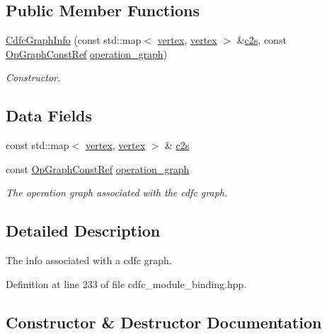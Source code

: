 \subsection*{Public Member Functions}
\begin{DoxyCompactItemize}
\item 
\hyperlink{structCdfcGraphInfo_a49d1bcde1db17f29b4cd4b5091cc06bf}{Cdfc\+Graph\+Info} (const std\+::map$<$ \hyperlink{graph_8hpp_abefdcf0544e601805af44eca032cca14}{vertex}, \hyperlink{graph_8hpp_abefdcf0544e601805af44eca032cca14}{vertex} $>$ \&\hyperlink{structCdfcGraphInfo_afb6c30bdac24d23936bb456ba4876238}{c2s}, const \hyperlink{op__graph_8hpp_a9a0b240622c47584bee6951a6f5de746}{Op\+Graph\+Const\+Ref} \hyperlink{structCdfcGraphInfo_ae5cfdb811e7bb8c91b2b593280300f5c}{operation\+\_\+graph})
\begin{DoxyCompactList}\small\item\em Constructor. \end{DoxyCompactList}\end{DoxyCompactItemize}
\subsection*{Data Fields}
\begin{DoxyCompactItemize}
\item 
const std\+::map$<$ \hyperlink{graph_8hpp_abefdcf0544e601805af44eca032cca14}{vertex}, \hyperlink{graph_8hpp_abefdcf0544e601805af44eca032cca14}{vertex} $>$ \& \hyperlink{structCdfcGraphInfo_afb6c30bdac24d23936bb456ba4876238}{c2s}
\item 
const \hyperlink{op__graph_8hpp_a9a0b240622c47584bee6951a6f5de746}{Op\+Graph\+Const\+Ref} \hyperlink{structCdfcGraphInfo_ae5cfdb811e7bb8c91b2b593280300f5c}{operation\+\_\+graph}
\begin{DoxyCompactList}\small\item\em The operation graph associated with the cdfc graph. \end{DoxyCompactList}\end{DoxyCompactItemize}


\subsection{Detailed Description}
The info associated with a cdfc graph. 

Definition at line 233 of file cdfc\+\_\+module\+\_\+binding.\+hpp.



\subsection{Constructor \& Destructor Documentation}
\mbox{\label{structCdfcGraphInfo_a49d1bcde1db17f29b4cd4b5091cc06bf}} 
